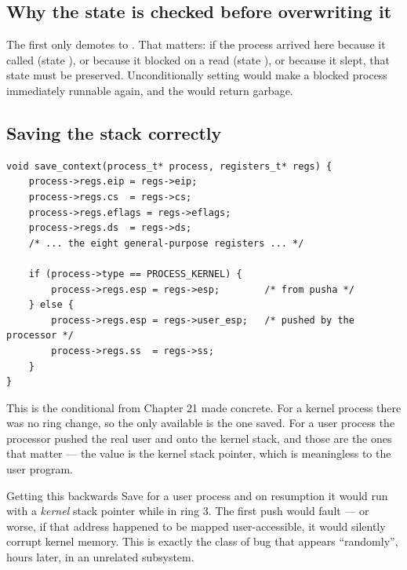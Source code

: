 \subsection{Why the state is checked before overwriting it}

The first  only demotes  to . That matters: if the process arrived
here because it called  (state ), or because it blocked on a read (state
), or because it slept, that state must be preserved. Unconditionally setting
 would make a blocked process immediately runnable again, and the  would return
garbage.

\subsection{Saving the stack correctly}

\begin{lstlisting}[style=c]
void save_context(process_t* process, registers_t* regs) {
    process->regs.eip = regs->eip;
    process->regs.cs  = regs->cs;
    process->regs.eflags = regs->eflags;
    process->regs.ds  = regs->ds;
    /* ... the eight general-purpose registers ... */

    if (process->type == PROCESS_KERNEL) {
        process->regs.esp = regs->esp;        /* from pusha */
    } else {
        process->regs.esp = regs->user_esp;   /* pushed by the processor */
        process->regs.ss  = regs->ss;
    }
}
\end{lstlisting}

This is the conditional from Chapter 21 made concrete. For a kernel process there was no ring change,
so the only  available is the one  saved. For a user process the processor
pushed the real user  and  onto the kernel stack, and those are the ones that
matter --- the  value is the kernel stack pointer, which is meaningless to the user
program.

\begin{danger}{Getting this backwards}
Save  for a user process and on resumption it would run with a \emph{kernel} stack
pointer while in ring 3. The first push would fault --- or worse, if that address happened to be
mapped user-accessible, it would silently corrupt kernel memory. This is exactly the class of bug
that appears ``randomly'', hours later, in an unrelated subsystem.
\end{danger}


